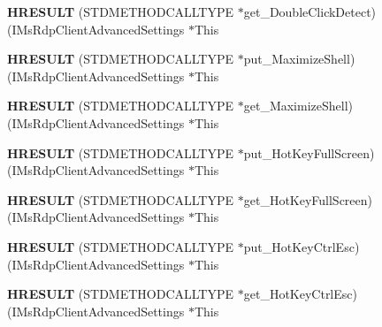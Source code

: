 \begin{DoxyCompactItemize}
{\bfseries H\+R\+E\+S\+U\+LT} (S\+T\+D\+M\+E\+T\+H\+O\+D\+C\+A\+L\+L\+T\+Y\+PE $\ast$get\+\_\+\+Double\+Click\+Detect)(I\+Ms\+Rdp\+Client\+Advanced\+Settings $\ast$This
\item 
\mbox{\label{struct_i_ms_rdp_client_advanced_settings_vtbl_ac27bb7b895868e7f29d82160e232fd89}} 
{\bfseries H\+R\+E\+S\+U\+LT} (S\+T\+D\+M\+E\+T\+H\+O\+D\+C\+A\+L\+L\+T\+Y\+PE $\ast$put\+\_\+\+Maximize\+Shell)(I\+Ms\+Rdp\+Client\+Advanced\+Settings $\ast$This
\item 
\mbox{\label{struct_i_ms_rdp_client_advanced_settings_vtbl_a94afc5c1555823c2ce95e14a7abed08f}} 
{\bfseries H\+R\+E\+S\+U\+LT} (S\+T\+D\+M\+E\+T\+H\+O\+D\+C\+A\+L\+L\+T\+Y\+PE $\ast$get\+\_\+\+Maximize\+Shell)(I\+Ms\+Rdp\+Client\+Advanced\+Settings $\ast$This
\item 
\mbox{\label{struct_i_ms_rdp_client_advanced_settings_vtbl_a7247725d7d8839fb1e9413a161abae1a}} 
{\bfseries H\+R\+E\+S\+U\+LT} (S\+T\+D\+M\+E\+T\+H\+O\+D\+C\+A\+L\+L\+T\+Y\+PE $\ast$put\+\_\+\+Hot\+Key\+Full\+Screen)(I\+Ms\+Rdp\+Client\+Advanced\+Settings $\ast$This
\item 
\mbox{\label{struct_i_ms_rdp_client_advanced_settings_vtbl_a523df7e1f257fde3e19ff50ad08c386c}} 
{\bfseries H\+R\+E\+S\+U\+LT} (S\+T\+D\+M\+E\+T\+H\+O\+D\+C\+A\+L\+L\+T\+Y\+PE $\ast$get\+\_\+\+Hot\+Key\+Full\+Screen)(I\+Ms\+Rdp\+Client\+Advanced\+Settings $\ast$This
\item 
\mbox{\label{struct_i_ms_rdp_client_advanced_settings_vtbl_a02ab42ddd5a6b677d2575eb580953241}} 
{\bfseries H\+R\+E\+S\+U\+LT} (S\+T\+D\+M\+E\+T\+H\+O\+D\+C\+A\+L\+L\+T\+Y\+PE $\ast$put\+\_\+\+Hot\+Key\+Ctrl\+Esc)(I\+Ms\+Rdp\+Client\+Advanced\+Settings $\ast$This
\item 
\mbox{\label{struct_i_ms_rdp_client_advanced_settings_vtbl_a1412fca8cd5d7ac897e896006683a5ea}} 
{\bfseries H\+R\+E\+S\+U\+LT} (S\+T\+D\+M\+E\+T\+H\+O\+D\+C\+A\+L\+L\+T\+Y\+PE $\ast$get\+\_\+\+Hot\+Key\+Ctrl\+Esc)(I\+Ms\+Rdp\+Client\+Advanced\+Settings $\ast$This
\item 

\end{DoxyCompactItemize}

